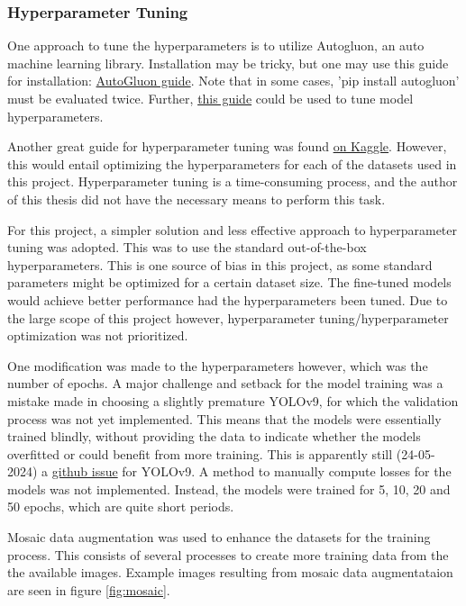 \subsubsection{Hyperparameter Tuning}
\label{sec:hyperparameter_tuning}
One approach to tune the hyperparameters is to utilize Autogluon, an auto machine learning library. Installation may be tricky, but one may use this guide for installation: \href{https://auto.gluon.ai/stable/install.html}{AutoGluon guide}. Note that in some cases, 'pip install autogluon' must be evaluated twice. Further, \href{https://auto.gluon.ai/scoredebugweight/tutorials/course/script.html}{this guide} could be used to tune model hyperparameters. 

Another great guide for hyperparameter tuning was found \href{https://www.kaggle.com/code/biditsadhukhan/yolo-v9-hyperparameter-tuning-freezing-layers}{on Kaggle}. However, this would entail optimizing the hyperparameters for each of the datasets used in this project. Hyperparameter tuning is a time-consuming process, and the author of this thesis did not have the necessary means to perform this task.

For this project, a simpler solution and less effective approach to hyperparameter tuning was adopted. This was to use the standard out-of-the-box hyperparameters. This is one source of bias in this project, as some standard parameters might be optimized for a certain dataset size. The fine-tuned models would achieve better performance had the hyperparameters been tuned. Due to the large scope of this project however, hyperparameter tuning/hyperparameter optimization was not prioritized.  

One modification was made to the hyperparameters however, which was the number of epochs. A major challenge and setback for the model training was a mistake made in choosing a slightly premature YOLOv9, for which the validation process was not yet implemented. This means that the models were essentially trained blindly, without providing the data to indicate whether the models overfitted or could benefit from more training. This is apparently still (24-05-2024) a \href{https://github.com/WongKinYiu/yolov9/issues/132}{github issue} for YOLOv9. A method to manually compute losses for the models was not implemented. Instead, the models were trained for 5, 10, 20 and 50 epochs, which are quite short periods.

Mosaic data augmentation was used to enhance the datasets for the training process. This consists of several processes to create more training data from the the available images. Example images resulting from mosaic data augmentataion are seen in figure \ref{fig:mosaic}.


